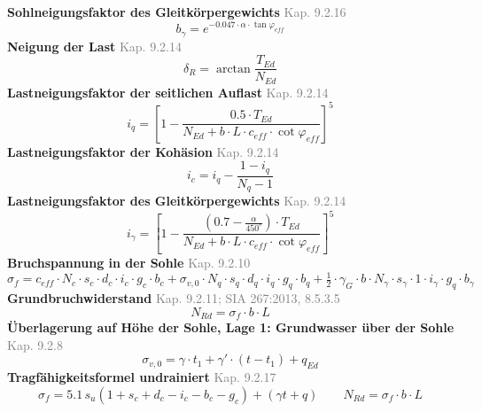\documentclass[11pt,a4paper]{article}
\newcommand{\normref}[1]{{\small\textcolor{gray}{#1}}}
\begin{document}
\noindent\textbf{Sohlneigungsfaktor des Gleitkörpergewichts} \hfill \normref{Kap. 9.2.16}
\begin{equation*}
b_{\gamma} = e^{-0.047 \cdot \alpha \cdot \tan \varphi_{eff}}
\end{equation*}
\noindent\textbf{Neigung der Last} \hfill \normref{Kap. 9.2.14}
\begin{equation*}
\delta_R = \arctan\frac{T_{Ed}}{N_{Ed}}
\end{equation*}
\noindent\textbf{Lastneigungsfaktor der seitlichen Auflast} \hfill \normref{Kap. 9.2.14}
\begin{equation*}
i_q = \left[1 - \frac{0.5 \cdot T_{Ed}}{N_{Ed} + b \cdot L \cdot c_{eff} \cdot \cot \varphi_{eff}}\right]^{5}
\end{equation*}
\noindent\textbf{Lastneigungsfaktor der Kohäsion} \hfill \normref{Kap. 9.2.14}
\begin{equation*}
i_c = i_q - \frac{1 - i_q}{N_q - 1}
\end{equation*}
\noindent\textbf{Lastneigungsfaktor des Gleitkörpergewichts} \hfill \normref{Kap. 9.2.14}
\begin{equation*}
i_{\gamma} = \left[1 - \frac{\left(0.7 - \frac{\alpha}{450^\circ}\right) \cdot T_{Ed}}{N_{Ed} + b \cdot L \cdot c_{eff} \cdot \cot \varphi_{eff}}\right]^{5}
\end{equation*}
\noindent\textbf{Bruchspannung in der Sohle} \hfill \normref{Kap. 9.2.10}
\begin{equation*}
\sigma_f = c_{eff} \cdot N_c \cdot s_c \cdot d_c \cdot i_c \cdot g_c \cdot b_c + \sigma_{v,0} \cdot N_q \cdot s_q \cdot d_q \cdot i_q \cdot g_q \cdot b_q + \tfrac{1}{2} \cdot \gamma_G \cdot b \cdot N_{\gamma} \cdot s_{\gamma} \cdot 1 \cdot i_{\gamma} \cdot g_q \cdot b_{\gamma}
\end{equation*}
\noindent\textbf{Grundbruchwiderstand} \hfill \normref{Kap. 9.2.11; SIA 267:2013, 8.5.3.5}
\begin{equation*}
N_{Rd} = \sigma_f \cdot b \cdot L
\end{equation*}
\noindent\textbf{Überlagerung auf Höhe der Sohle, Lage 1: Grundwasser über der Sohle} \hfill \normref{Kap. 9.2.8}
\begin{equation*}
\sigma_{v,0} = \gamma \cdot t_1 + \gamma' \cdot \left(t - t_1\right) + q_{Ed}
\end{equation*}
\noindent\textbf{Tragfähigkeitsformel undrainiert} \hfill \normref{Kap. 9.2.17}
\begin{equation*}
\sigma_f = 5.1 \, s_u \left(1 + s_c + d_c - i_c - b_c - g_c\right) + \left(\gamma t + q\right) \qquad N_{Rd} = \sigma_f \cdot b \cdot L
\end{equation*}
\end{document}
